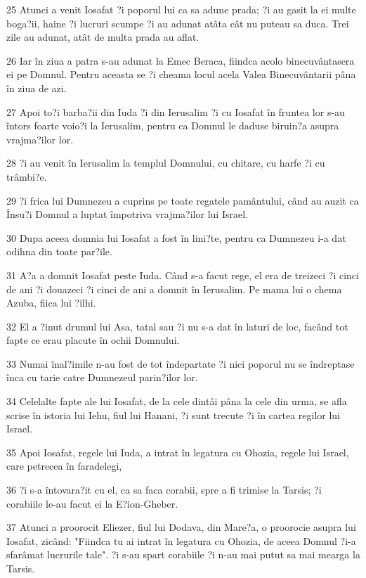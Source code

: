 \par 25 Atunci a venit Iosafat ?i poporul lui ca sa adune prada; ?i au gasit la ei multe boga?ii, haine ?i lucruri scumpe ?i au adunat atâta cât nu puteau sa duca. Trei zile au adunat, atât de multa prada au aflat.
\par 26 Iar în ziua a patra s-au adunat la Emec Beraca, fiindca acolo binecuvântasera ei pe Domnul. Pentru aceasta se ?i cheama locul acela Valea Binecuvântarii pâna în ziua de azi.
\par 27 Apoi to?i barba?ii din Iuda ?i din Ierusalim ?i cu Iosafat în fruntea lor s-au întors foarte voio?i la Ierusalim, pentru ca Domnul le daduse biruin?a asupra vrajma?ilor lor.
\par 28 ?i au venit în Ierusalim la templul Domnului, cu chitare, cu harfe ?i cu trâmbi?e.
\par 29 ?i frica lui Dumnezeu a cuprins pe toate regatele pamântului, când au auzit ca Însu?i Domnul a luptat împotriva vrajma?ilor lui Israel.
\par 30 Dupa aceea domnia lui Iosafat a fost în lini?te, pentru ca Dumnezeu i-a dat odihna din toate par?ile.
\par 31 A?a a domnit Iosafat peste Iuda. Când s-a facut rege, el era de treizeci ?i cinci de ani ?i douazeci ?i cinci de ani a domnit în Ierusalim. Pe mama lui o chema Azuba, fiica lui ?ilhi.
\par 32 El a ?inut drumul lui Asa, tatal sau ?i nu s-a dat în laturi de loc, facând tot fapte ce erau placute în ochii Domnului.
\par 33 Numai înal?imile n-au fost de tot îndepartate ?i nici poporul nu se îndreptase înca cu tarie catre Dumnezeul parin?ilor lor.
\par 34 Celelalte fapte ale lui Iosafat, de la cele dintâi pâna la cele din urma, se afla scrise în istoria lui Iehu, fiul lui Hanani, ?i sunt trecute ?i în cartea regilor lui Israel.
\par 35 Apoi Iosafat, regele lui Iuda, a intrat în legatura cu Ohozia, regele lui Israel, care petrecea în faradelegi,
\par 36 ?i s-a întovara?it cu el, ca sa faca corabii, spre a fi trimise la Tarsis; ?i corabiile le-au facut ei la E?ion-Gheber.
\par 37 Atunci a proorocit Eliezer, fiul lui Dodava, din Mare?a, o proorocie asupra lui Iosafat, zicând: "Fiindca tu ai intrat în legatura cu Ohozia, de aceea Domnul ?i-a sfarâmat lucrurile tale". ?i s-au spart corabiile ?i n-au mai putut sa mai mearga la Tarsis.

